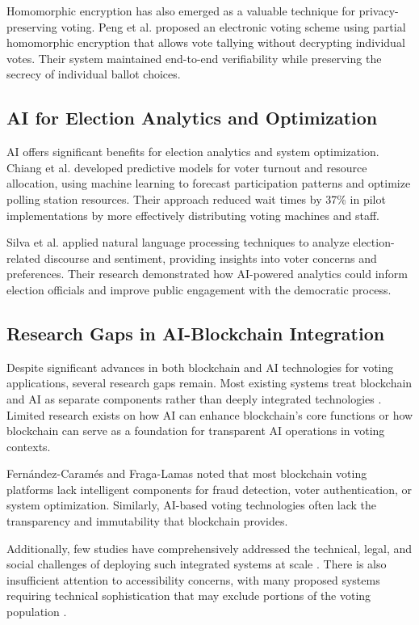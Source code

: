 \documentclass[conference]{IEEEtran}
\begin{document}
Homomorphic encryption has also emerged as a valuable technique for privacy-preserving voting. Peng et al. \cite{b18} proposed an electronic voting scheme using partial homomorphic encryption that allows vote tallying without decrypting individual votes. Their system maintained end-to-end verifiability while preserving the secrecy of individual ballot choices.

\subsection{AI for Election Analytics and Optimization}
AI offers significant benefits for election analytics and system optimization. Chiang et al. \cite{b19} developed predictive models for voter turnout and resource allocation, using machine learning to forecast participation patterns and optimize polling station resources. Their approach reduced wait times by 37\% in pilot implementations by more effectively distributing voting machines and staff.

Silva et al. \cite{b20} applied natural language processing techniques to analyze election-related discourse and sentiment, providing insights into voter concerns and preferences. Their research demonstrated how AI-powered analytics could inform election officials and improve public engagement with the democratic process.

\subsection{Research Gaps in AI-Blockchain Integration}
Despite significant advances in both blockchain and AI technologies for voting applications, several research gaps remain. Most existing systems treat blockchain and AI as separate components rather than deeply integrated technologies \cite{b9}. Limited research exists on how AI can enhance blockchain's core functions or how blockchain can serve as a foundation for transparent AI operations in voting contexts.

Fernández-Caramés and Fraga-Lamas \cite{b9} noted that most blockchain voting platforms lack intelligent components for fraud detection, voter authentication, or system optimization. Similarly, AI-based voting technologies often lack the transparency and immutability that blockchain provides.

Additionally, few studies have comprehensively addressed the technical, legal, and social challenges of deploying such integrated systems at scale \cite{b10}. There is also insufficient attention to accessibility concerns, with many proposed systems requiring technical sophistication that may exclude portions of the voting population \cite{b7}.
\end{document}
